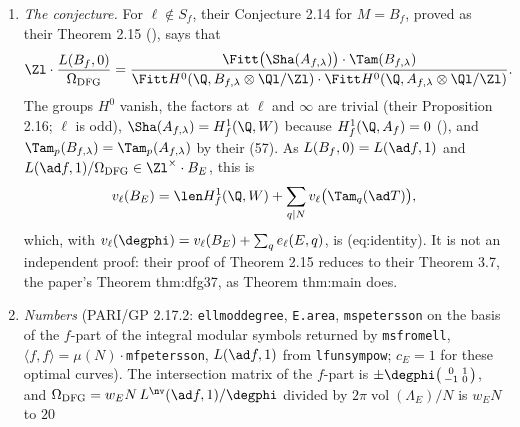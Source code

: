 \begin{remark}
\begin{enumerate}[label=(\alph*)]
Deligne's period relative to their integral structure, $\Omega_{\mathrm{DFG}}=c^+(B_f)/e$, satisfies
\[
\Omega_{\mathrm{DFG}}\in\Zl^\times\cdot\frac{w_EN\,L^{\nv}(\ad f,1)}{\degphi}=\Zl^\times\cdot w_E\,\frac{2\pi\operatorname{vol}(\Lambda_E)}{c_E^2}=\Zl^\times\cdot w_EN\cdot\frac{2\pi\operatorname{vol}(\Lambda_E)}{c_E^2N}.
\]
The bookkeeping behind the unit: the $\frac12$ of (d) is matched by the $\frac12$ in $\frac u2$, and $\degphi$ cancels between the Petersson norm and $\eta^\emptyset$. The
constant $u$ is known only to be an $\ell$-adic unit, so the comparison is asserted up to $\Zl^\times$ and not up to sign; nothing more is used. The only discrepancy with the book's normalisation $2\pi\operatorname{vol}(\Lambda_E)/(c_E^2N)$ is therefore the factor $w_EN$,
a unit at every $\ell\nmid N$; no power of $2$ or $\pi$ is left over.
\item \emph{The conjecture.} For $\ell\notin S_f$, their Conjecture 2.14 for $M=B_f$, proved as their Theorem 2.15 (), says that
\[
\Zl\cdot\frac{L(B_f,0)}{\Omega_{\mathrm{DFG}}}=\frac{\Fitt\bigl(\Sha(A_{f,\lambda})\bigr)\cdot\Tam(B_{f,\lambda})}{\Fitt H^0(\Q,B_{f,\lambda}\otimes\Ql/\Zl)\cdot\Fitt H^0(\Q,A_{f,\lambda}\otimes\Ql/\Zl)}.
\]
The groups $H^0$ vanish, the factors at $\ell$ and $\infty$ are trivial
(their Proposition 2.16; $\ell$ is odd), $\Sha(A_{f,\lambda})=H^1_f(\Q,W)$ because $H^1_f(\Q,A_f)=0$ (), and $\Tam_p(B_{f,\lambda})=\Tam_p(A_{f,\lambda})$ by their
(57). As $L(B_f,0)=L(\ad f,1)$ and $L(\ad f,1)/\Omega_{\mathrm{DFG}}\in\Zl^\times\cdot B_E$, this is
\[
v_\ell(B_E)=\len H^1_f(\Q,W)+\sum_{q\mid N}v_\ell\bigl(\Tam_q(\ad T)\bigr),
\]
which, with $v_\ell(\degphi)=v_\ell(B_E)+\sum_qe_\ell(E,q)$, is (eq:identity). It is not an independent proof: their proof of Theorem 2.15 reduces to their Theorem 3.7, the paper's
Theorem thm:dfg37, as Theorem thm:main does.
\item \emph{Numbers} (PARI/GP 2.17.2: \texttt{ellmoddegree}, \texttt{E.area}, \texttt{mspetersson} on the basis of the $f$-part of the integral modular symbols returned by
\texttt{msfromell}, $\langle f,f\rangle=\mu(N)\cdot$\texttt{mfpetersson}, $L(\ad f,1)$ from \texttt{lfunsympow}; $c_E=1$ for these optimal curves). The intersection matrix of the $f$-part is
$\pm\degphi\bigl(\begin{smallmatrix}0&1\\-1&0\end{smallmatrix}\bigr)$, and $\Omega_{\mathrm{DFG}}=w_EN\,L^{\nv}(\ad f,1)/\degphi$ divided by $2\pi\operatorname{vol}(\Lambda_E)/N$ is $w_EN$ to $20$

\end{enumerate}
\end{remark}
